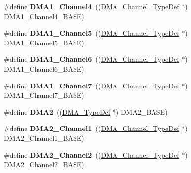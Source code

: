 \begin{DoxyCompactItemize}
\item 
\hypertarget{group___peripheral__declaration_gad2c42743316bf64da557130061b1f56a}{\#define {\bfseries D\-M\-A1\-\_\-\-Channel4}~((\hyperlink{struct_d_m_a___channel___type_def}{D\-M\-A\-\_\-\-Channel\-\_\-\-Type\-Def} $\ast$) D\-M\-A1\-\_\-\-Channel4\-\_\-\-B\-A\-S\-E)}\label{group___peripheral__declaration_gad2c42743316bf64da557130061b1f56a}

\item 
\hypertarget{group___peripheral__declaration_ga06ff98ddef3c962795d2e2444004abff}{\#define {\bfseries D\-M\-A1\-\_\-\-Channel5}~((\hyperlink{struct_d_m_a___channel___type_def}{D\-M\-A\-\_\-\-Channel\-\_\-\-Type\-Def} $\ast$) D\-M\-A1\-\_\-\-Channel5\-\_\-\-B\-A\-S\-E)}\label{group___peripheral__declaration_ga06ff98ddef3c962795d2e2444004abff}

\item 
\hypertarget{group___peripheral__declaration_gac013c4376e4797831b5ddd2a09519df8}{\#define {\bfseries D\-M\-A1\-\_\-\-Channel6}~((\hyperlink{struct_d_m_a___channel___type_def}{D\-M\-A\-\_\-\-Channel\-\_\-\-Type\-Def} $\ast$) D\-M\-A1\-\_\-\-Channel6\-\_\-\-B\-A\-S\-E)}\label{group___peripheral__declaration_gac013c4376e4797831b5ddd2a09519df8}

\item 
\hypertarget{group___peripheral__declaration_ga4f9c23b3d1add93ed206b5c9afa5cda3}{\#define {\bfseries D\-M\-A1\-\_\-\-Channel7}~((\hyperlink{struct_d_m_a___channel___type_def}{D\-M\-A\-\_\-\-Channel\-\_\-\-Type\-Def} $\ast$) D\-M\-A1\-\_\-\-Channel7\-\_\-\-B\-A\-S\-E)}\label{group___peripheral__declaration_ga4f9c23b3d1add93ed206b5c9afa5cda3}

\item 
\hypertarget{group___peripheral__declaration_ga506520140eec1708bc7570c49bdf972d}{\#define {\bfseries D\-M\-A2}~((\hyperlink{struct_d_m_a___type_def}{D\-M\-A\-\_\-\-Type\-Def} $\ast$) D\-M\-A2\-\_\-\-B\-A\-S\-E)}\label{group___peripheral__declaration_ga506520140eec1708bc7570c49bdf972d}

\item 
\hypertarget{group___peripheral__declaration_gad86c75e1ff89e03e15570f47962865c8}{\#define {\bfseries D\-M\-A2\-\_\-\-Channel1}~((\hyperlink{struct_d_m_a___channel___type_def}{D\-M\-A\-\_\-\-Channel\-\_\-\-Type\-Def} $\ast$) D\-M\-A2\-\_\-\-Channel1\-\_\-\-B\-A\-S\-E)}\label{group___peripheral__declaration_gad86c75e1ff89e03e15570f47962865c8}

\item 
\hypertarget{group___peripheral__declaration_ga316024020799373b9d8e35c316c74f24}{\#define {\bfseries D\-M\-A2\-\_\-\-Channel2}~((\hyperlink{struct_d_m_a___channel___type_def}{D\-M\-A\-\_\-\-Channel\-\_\-\-Type\-Def} $\ast$) D\-M\-A2\-\_\-\-Channel2\-\_\-\-B\-A\-S\-E)}\label{group___peripheral__declaration_ga316024020799373b9d8e35c316c74f24}


\end{DoxyCompactItemize}
